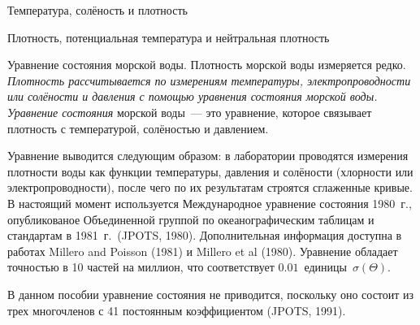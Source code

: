 \begin{chapter}{Температура, солёность и плотность}
\begin{section}{Плотность, потенциальная температура и нейтральная плотность}
\begin{paragraph}{Уравнение состояния морской воды.}
Плотность морской воды измеряется редко. \emph{Плотность рассчитывается по
измерениям температуры, электропроводности или солёности и давления с
помощью уравнения состояния морской воды.} \emph{Уравнение состояния} морской
воды~--- это уравнение, которое связывает плотность с температурой,
солёностью и давлением.
%

Уравнение выводится следующим образом: в лаборатории проводятся
измерения плотности воды как функции температуры, давления и солёности 
(хлорности или электропроводности), после чего по их результатам строятся
сглаженные кривые. В настоящий момент используется Международное 
уравнение состояния 1980~г., опубликованое Объединенной группой по 
океанографическим таблицам и стандартам в 1981~г.\ (JPOTS, 1980). 
Дополнительная информация доступна в работах Millero and Poisson (1981) 
и Millero et al (1980). 
Уравнение обладает точностью в 10 частей на миллион, что соответствует 
$0.01$~единицы~$\sigma(\Theta)$.
%

В данном пособии уравнение состояния не приводится, поскольку оно состоит
из трех многочленов с 41 постоянным коэффициентом (JPOTS, 1991).
%
\end{paragraph}


\end{section}
\end{chapter}
